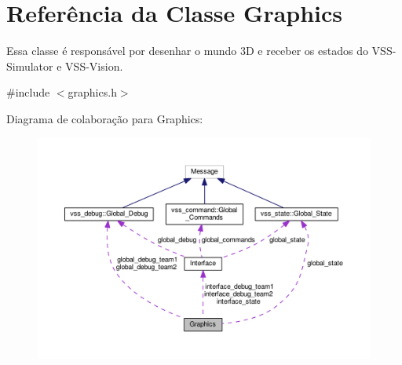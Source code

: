 \hypertarget{classGraphics}{}\section{Referência da Classe Graphics}
\label{classGraphics}


Essa classe é responsável por desenhar o mundo 3D e receber os estados do V\+S\+S-\/\+Simulator e V\+S\+S-\/\+Vision.  




{\ttfamily \#include $<$graphics.\+h$>$}



Diagrama de colaboração para Graphics\+:\nopagebreak
\begin{figure}[H]
\begin{center}
\leavevmode
\includegraphics[width=350pt]{classGraphics__coll__graph}
\end{center}
\end{figure}
